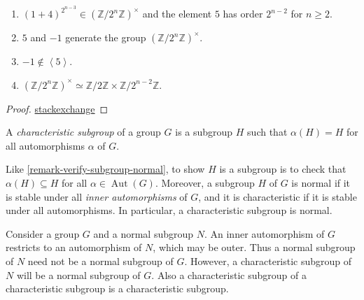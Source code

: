 \begin{lemma}
  \label{lemma-automorphisms-of-cyclic-group-2}
  \begin{enumerate}
    \item \( (1 + 4)^{2^{n - 3}} \in (\mathbb{Z} / 2^n \mathbb{Z})^\times \) and the element \( 5 \) has order \( 2^{n - 2} \) for \( n \geq 2 \).
    \item \( 5 \) and \( -1 \) generate the group \( (\mathbb{Z} / 2^n \mathbb{Z})^{\times} \).
    \item \( -1 \notin \left\langle 5 \right\rangle \).
    \item \( (\mathbb{Z} / 2^n\mathbb{Z})^{\times} \simeq \mathbb{Z} / 2 \mathbb{Z} \times \mathbb{Z} / 2^{n - 2} \mathbb{Z}  \).
  \end{enumerate}
\end{lemma}
\begin{proof}
  \href{https://math.stackexchange.com/questions/459815/the-structure-of-the-group-mathbbz-2n-mathbbz}{stackexchange}
\end{proof}

\begin{definition}
  \label{definition-characteristic-subgroup}
  A \emph{characteristic subgroup} of a group \( G \) is a subgroup \( H \) such that \( \alpha(H) = H \) for all automorphisms \( \alpha \) of \( G \).
\end{definition}

\begin{remark}
  \label{remark-verify-subgroup-characteristic}
  Like \ref{remark-verify-subgroup-normal}, to show \( H \) is a subgroup is to check that \( \alpha(H) \subseteq H \) for all \( \alpha \in \operatorname{Aut}(G) \).
  Moreover, a subgroup \( H \) of \( G \) is normal if it is stable under all \emph{inner automorphisms} of \( G \), and it is characteristic if it is stable under all automorphisms.
  In particular, a characteristic subgroup is normal.
\end{remark}

\begin{remark}
  \label{remark-characteristic-subgroup}
  Consider a group \( G \) and a normal subgroup \( N \). %
  An inner automorphism of \( G \) restricts to an automorphism of \( N \), which may be outer.
  Thus a normal subgroup of \( N \) need not be a normal subgroup of \( G \).
  However, a characteristic subgroup of \( N \) will be a normal subgroup of \( G \).
  Also a characteristic subgroup of a characteristic subgroup is a characteristic subgroup.
\end{remark}


